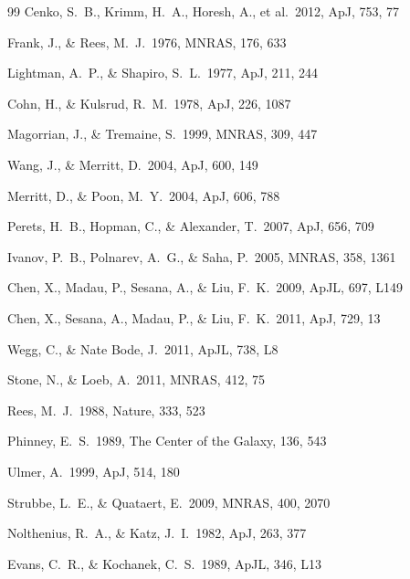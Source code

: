 \documentclass[useAMS, twocolumn, usenatbib]{mn2e}
\begin{document}
\begin{thebibliography}{99}
 Cenko, S.~B., Krimm, 
H.~A., Horesh, A., et al.\ 2012, ApJ, 753, 77 

 Frank, J., \& Rees, M.~J.\ 1976, MNRAS, 176, 633 

 Lightman, A.~P., \& Shapiro, S.~L.\ 1977, ApJ, 211, 244 

 Cohn, H., \& Kulsrud, R.~M.\ 1978, ApJ, 226, 1087 

 Magorrian, J., \& Tremaine, S.\ 1999, MNRAS, 309, 447 

 Wang, J., \& Merritt, D.\ 2004, ApJ, 600, 149 

 Merritt, D., \& Poon, M.~Y.\ 2004, ApJ, 606, 788 

 Perets, H.~B., Hopman, 
C., \& Alexander, T.\ 2007, ApJ, 656, 709 

 Ivanov, P.~B., Polnarev, 
A.~G., \& Saha, P.\ 2005, MNRAS, 358, 1361 

 Chen, X., Madau, P., 
Sesana, A., \& Liu, F.~K.\ 2009, ApJL, 697, L149 

 Chen, X., Sesana, A., 
Madau, P., \& Liu, F.~K.\ 2011, ApJ, 729, 13 

 Wegg, C., \& Nate Bode, J.\ 2011, ApJL, 738, L8 

 Stone, N., \& Loeb, A.\ 2011, MNRAS, 412, 75 

 Rees, M.~J.\ 1988, Nature, 333, 523 

 Phinney, E.~S.\ 1989, The 
Center of the Galaxy, 136, 543 

 Ulmer, A.\ 1999, ApJ, 514, 180 

 Strubbe, L.~E., \& Quataert, E.\ 2009, MNRAS, 400, 2070 

 Nolthenius, R.~A., \& Katz, J.~I.\ 1982, ApJ, 263, 377 

 Evans, C.~R., \& Kochanek, C.~S.\ 1989, ApJL, 346, L13


\end{thebibliography}
\end{document}
